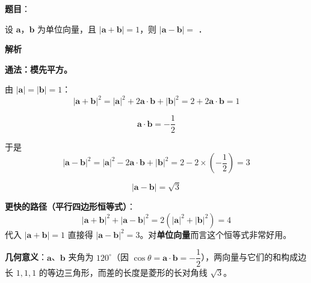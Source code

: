 \begin{answer}

\textbf{题目}：

设 $\boldsymbol a$，$\boldsymbol b$ 为单位向量，且 $|\boldsymbol a+\boldsymbol b|=1$，则 $|\boldsymbol a-\boldsymbol b|=$ \gkblank{}．

\textbf{解析}

\textbf{通法：模先平方。}

由 $|\boldsymbol a|=|\boldsymbol b|=1$：
\nopagebreak[4]
\[|\boldsymbol a+\boldsymbol b|^{2}=|\boldsymbol a|^{2}+2\boldsymbol a\cdot\boldsymbol b+|\boldsymbol b|^{2}=2+2\boldsymbol a\cdot\boldsymbol b=1\]

\nopagebreak[4]
\[\boldsymbol a\cdot\boldsymbol b=-\frac12\]

于是
\nopagebreak[4]
\[|\boldsymbol a-\boldsymbol b|^{2}=|\boldsymbol a|^{2}-2\boldsymbol a\cdot\boldsymbol b+|\boldsymbol b|^{2}=2-2\times\left(-\frac12\right)=3\]

\nopagebreak[4]
\[|\boldsymbol a-\boldsymbol b|=\sqrt3\]

\begin{gktip}
\textbf{更快的路径（平行四边形恒等式）}：
\nopagebreak[4]
\[|\boldsymbol a+\boldsymbol b|^{2}+|\boldsymbol a-\boldsymbol b|^{2}=2\left(|\boldsymbol a|^{2}+|\boldsymbol b|^{2}\right)=4\]
代入 $|\boldsymbol a+\boldsymbol b|=1$ 直接得 $|\boldsymbol a-\boldsymbol b|^{2}=3$。对\textbf{单位向量}而言这个恒等式非常好用。

\textbf{几何意义}：$\boldsymbol a$、$\boldsymbol b$ 夹角为 $120^\circ$（因 $\cos\theta=\boldsymbol a\cdot\boldsymbol b=-\dfrac12$），两向量与它们的和构成边长 $1,1,1$ 的等边三角形，而差的长度是菱形的长对角线 $\sqrt3$。
\end{gktip}


\par\medskip

\end{answer}

